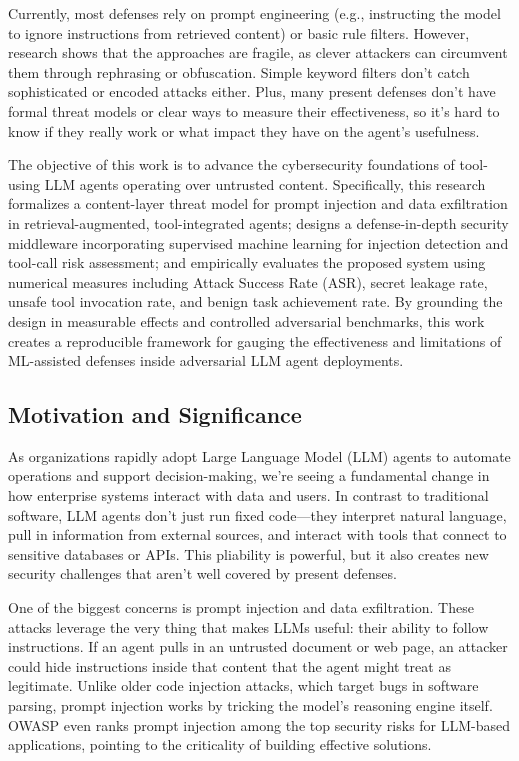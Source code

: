 \documentclass[11pt]{article}
\begin{document}
Currently, most defenses rely on prompt engineering (e.g., instructing the model to ignore instructions from retrieved content) or basic rule filters. However, research shows that the approaches are fragile, as clever attackers can circumvent them through rephrasing or obfuscation. Simple keyword filters don't catch sophisticated or encoded attacks either. Plus, many present defenses don't have formal threat models or clear ways to measure their effectiveness, so it's hard to know if they really work or what impact they have on the agent's usefulness.

The objective of this work is to advance the cybersecurity foundations of tool-using LLM agents operating over untrusted content. Specifically, this research formalizes a content-layer threat model for prompt injection and data exfiltration in retrieval-augmented, tool-integrated agents; designs a defense-in-depth security middleware incorporating supervised machine learning for injection detection and tool-call risk assessment; and empirically evaluates the proposed system using numerical measures including Attack Success Rate (ASR), secret leakage rate, unsafe tool invocation rate, and benign task achievement rate. By grounding the design in measurable effects and controlled adversarial benchmarks, this work creates a reproducible framework for gauging the effectiveness and limitations of ML-assisted defenses inside adversarial LLM agent deployments.


\subsection{Motivation and Significance}
As organizations rapidly adopt Large Language Model (LLM) agents to automate operations and support decision-making, we're seeing a fundamental change in how enterprise systems interact with data and users. In contrast to traditional software, LLM agents don't just run fixed code---they interpret natural language, pull in information from external sources, and interact with tools that connect to sensitive databases or APIs. This pliability is powerful, but it also creates new security challenges that aren't well covered by present defenses.

One of the biggest concerns is prompt injection and data exfiltration. These attacks leverage the very thing that makes LLMs useful: their ability to follow instructions. If an agent pulls in an untrusted document or web page, an attacker could hide instructions inside that content that the agent might treat as legitimate. Unlike older code injection attacks, which target bugs in software parsing, prompt injection works by tricking the model's reasoning engine itself. OWASP even ranks prompt injection among the top security risks for LLM-based applications, pointing to the criticality of building effective solutions.\cite{owasp_llm}
\end{document}
